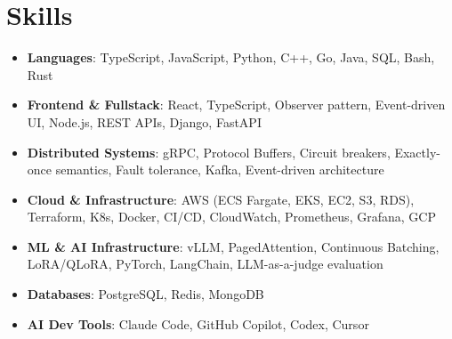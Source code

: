 \documentclass[letterpaper,11pt]{article}
\newcommand{\resumeSubHeadingListStart}{\begin{itemize}[leftmargin=0.15in, label={}]}
\newcommand{\resumeSubHeadingListEnd}{\end{itemize}}
\newcommand{\resumeSkillHeading}[2]{%
  \item\small{\textbf{#1}: #2 \vspace{-9pt}}%
}
\begin{document}
\section{Skills}
  \resumeSubHeadingListStart
    \resumeSkillHeading{Languages}{TypeScript, JavaScript, Python, C++, Go, Java, SQL, Bash, Rust}
    \resumeSkillHeading{Frontend \& Fullstack}{React, TypeScript, Observer pattern, Event-driven UI, Node.js, REST APIs, Django, FastAPI}
    \resumeSkillHeading{Distributed Systems}{gRPC, Protocol Buffers, Circuit breakers, Exactly-once semantics, Fault tolerance, Kafka, Event-driven architecture}
    \resumeSkillHeading{Cloud \& Infrastructure}{AWS (ECS Fargate, EKS, EC2, S3, RDS), Terraform, K8s, Docker, CI/CD, CloudWatch, Prometheus, Grafana, GCP}
    \resumeSkillHeading{ML \& AI Infrastructure}{vLLM, PagedAttention, Continuous Batching, LoRA/QLoRA, PyTorch, LangChain, LLM-as-a-judge evaluation}
    \resumeSkillHeading{Databases}{PostgreSQL, Redis, MongoDB}
    \resumeSkillHeading{AI Dev Tools}{Claude Code, GitHub Copilot, Codex, Cursor}
  \resumeSubHeadingListEnd
\end{document}
